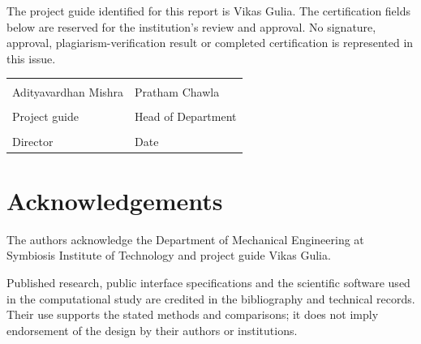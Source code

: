The project guide identified for this report is Vikas Gulia. The certification fields below are reserved for the institution's review and approval. No signature, approval, plagiarism-verification result or completed certification is represented in this issue.
\vspace{16mm}
\begin{tabular}{p{}p{}}
\hrulefill & \hrulefill\\
Adityavardhan Mishra & Pratham Chawla\\[18mm]
\hrulefill & \hrulefill\\
Project guide & Head of Department\\[18mm]
\hrulefill & \hrulefill\\
Director & Date
\end{tabular}
\clearpage
\chapter*{Acknowledgements}
The authors acknowledge the Department of Mechanical Engineering at Symbiosis Institute of Technology and project guide Vikas Gulia.

Published research, public interface specifications and the scientific software used in the computational study are credited in the bibliography and technical records. Their use supports the stated methods and comparisons; it does not imply endorsement of the design by their authors or institutions.
\clearpage
\tableofcontents
\clearpage
\listoffigures
\clearpage
\listoftables
\clearpage
